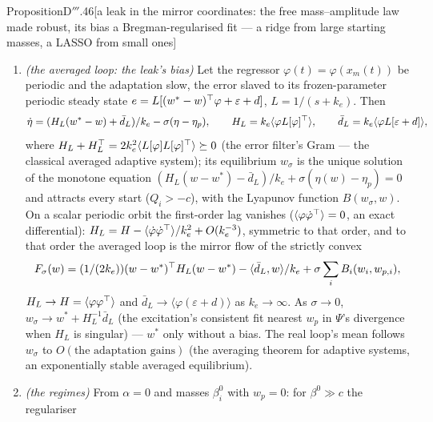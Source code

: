 \begin{thm}{Proposition}{D$'''$.46}[a leak in the mirror coordinates: the free mass--amplitude law made robust, its bias
a Bregman-regularised fit --- a ridge from large starting masses, a LASSO from small
ones]
\begin{enumerate}[label=\textup{(\roman*)}]
    $C = \bar d^2/(2k_e) + \sigma B(w^*,w_p)$: $e$ and the parameters are ultimately bounded, whatever the disturbance's
    form (the bound minimised over the split). Without the leak nothing bounds the free masses' coefficients a priori
    (the conserved law's $\abs\fhat\le a_{\max}$ is lost with the constraint): a decaying excitation and a bounded
    disturbance can drive them to infinity --- $\varphi(t) = (1 + t)^{-1/2}$ and a $d$ built for it give
    $w\propto(1 + t)^{1/4}$ with $e\to0$ ---, while on a persistently exciting orbit they converge, slowly, to the biased
    fit $w^* + H_L^{-1}\bar d_L$ of (ii). With $d = 0$ the leak's price is the bias below.
  \item \emph{(the averaged loop: the leak's bias)} Let the regressor $\varphi(t) = \varphi(x_m(t))$ be periodic and the
    adaptation slow, the error slaved to its frozen-parameter periodic steady state
    $e = L[(w^* - w)^\top\varphi + \varepsilon + d]$, $L = 1/(s + k_e)$. Then
    \[
      \dot\eta = (H_L(w^* - w) + \bar d_L)/k_e - \sigma(\eta - \eta_p),\qquad
      H_L = k_e\langle\varphi L[\varphi]^\top\rangle,\qquad \bar d_L = k_e\langle\varphi L[\varepsilon + d]\rangle,
    \]
    where $H_L + H_L^\top = 2k_e^2\langle L[\varphi]L[\varphi]^\top\rangle\succeq0$ (the error filter's Gram --- the
    classical averaged adaptive system); its equilibrium $w_\sigma$ is the unique solution of the monotone equation
    $(H_L(w - w^*) - \bar d_L)/k_e + \sigma(\eta(w) - \eta_p) = 0$ and attracts every start ($Q_i > -c$), with the
    Lyapunov function $B(w_\sigma,w)$. On a scalar periodic orbit the first-order lag vanishes
    ($\langle\varphi\dot\varphi^\top\rangle = 0$, an exact differential):
    $H_L = H - \langle\dot\varphi\dot\varphi^\top\rangle/k_e^2 + O(k_e^{-3})$, symmetric to that order, and to that order
    the averaged loop is the mirror flow of the strictly convex
    \[
      F_\sigma(w) = (1/(2k_e))(w - w^*)^\top H_L(w - w^*) - \langle\bar d_L,w\rangle/k_e
      + \sigma\sum_iB_i(w_i,w_{p,i}),
    \]
    $H_L\to H = \langle\varphi\varphi^\top\rangle$ and $\bar d_L\to\langle\varphi(\varepsilon + d)\rangle$ as
    $k_e\to\infty$. As $\sigma\to0$, $w_\sigma\to w^* + H_L^{-1}\bar d_L$ (the excitation's consistent fit nearest $w_p$
    in $\Psi$'s divergence when $H_L$ is singular) --- $w^*$ only without a bias. The real loop's mean follows
    $w_\sigma$ to $O(\text{the adaptation gains})$ (the averaging theorem for adaptive systems, an exponentially stable
    averaged equilibrium).
  \item \emph{(the regimes)} From $\alpha = 0$ and masses $\beta^0_i$ with $w_p = 0$: for $\beta^0\gg c$ the regulariser

\end{enumerate}
\end{thm}
